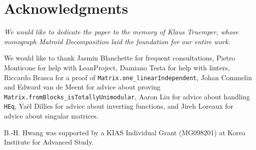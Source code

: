 \section{Acknowledgments}

\emph{We would like to dedicate the paper to the memory of Klaus Truemper, whose monograph Matroid Decomposition \cite{Truemper2016} laid the foundation for our entire work.}

We would like to thank
Jasmin Blanchette for frequent consultations,
Pietro Monticone for help with LeanProject,
Damiano Testa for help with linters,
Riccardo Brasca for a proof of \texttt{Matrix.one\_linearIndependent},
Johan Commelin and Edward van de Meent for advice about proving \texttt{Matrix.fromBlocks\_isTotallyUnimodular},
Aaron Liu for advice about handling \texttt{HEq},
Yaël Dillies for advice about inverting functions,
and Jireh Loreaux for advice about singular matrices.

B.-H. Hwang was supported by a KIAS Individual Grant (MG098201) at Korea Institute for Advanced Study.
